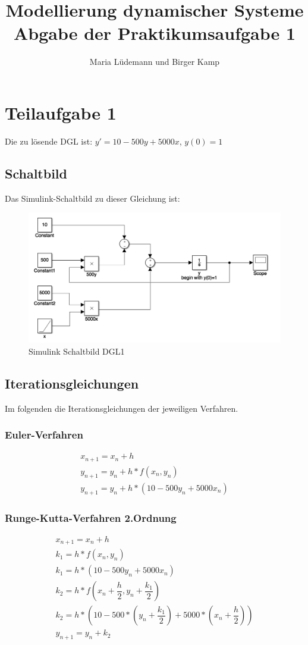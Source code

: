 \documentclass[]{scrartcl}
\title{Modellierung dynamischer Systeme  \\ Abgabe der Praktikumsaufgabe 1}
\author{Maria Lüdemann und Birger Kamp}
\begin{document}
\maketitle

\begin{abstract}

\end{abstract}

\section{Teilaufgabe 1}
Die zu lösende DGL ist:
$ y' = 10 - 500y + 5000x $,
$ y(0) = 1 $

\subsection*{Schaltbild}
Das Simulink-Schaltbild zu dieser Gleichung ist:

\begin{figure}[htbp]
\centering
\includegraphics[width=0.7\linewidth]{a1_1_Schaltbild}
\caption{Simulink Schaltbild DGL1}
\label{fig:A1_1_Schaltbild}
\end{figure}

\subsection{Iterationsgleichungen}
Im folgenden die Iterationsgleichungen der jeweiligen Verfahren.

\subsubsection{Euler-Verfahren}
\begin{align}
x_{n+1} = x_{n}+h \\
y_{n+1} = y_{n}+h*f(x_{n},y_{n}) \\
y_{n+1} = y_{n}+h*(10-500y_{n}+5000x_{n})
\end{align}

\subsubsection{Runge-Kutta-Verfahren 2.Ordnung}
\begin{align}
x_{n+1} = x_{n}+h \\
k_{1} = h*f(x_{n},y_{n}) \\
k_{1} = h*(10-500y_{n}+5000x_{n}) \\
k_{2} = h*f(x_{n} + \dfrac{h}{2},y_{n} + \dfrac{k_{1}}{2}) \\
k_{2} = h*(10-500*(y_{n} + \dfrac{k_{1}}{2})+5000*(x_{n} + \dfrac{h}{2})) \\
y_{n+1} = y_{n}+k_{2}
\end{align}
\end{document}
